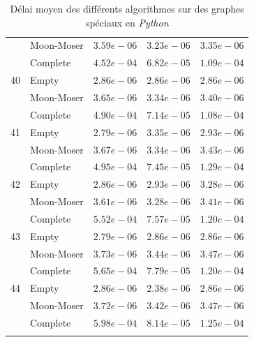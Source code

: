 \documentclass[12pt,a4paper]{article}
\begin{document}
\begin{longtable}{|l||l|l|l|l|}
  & Moon-Moser & $3.59e-06$ & $3.23e-06$ & $3.35e-06$ \\
  & Complete & $4.52e-04$ & $6.82e-05$ & $1.09e-04$ \\
  \hline
  40 & Empty & $2.86e-06$ & $2.86e-06$ & $2.86e-06$ \\
  & Moon-Moser & $3.65e-06$ & $3.34e-06$ & $3.40e-06$ \\
  & Complete & $4.90e-04$ & $7.14e-05$ & $1.08e-04$ \\
  \hline
  41 & Empty & $2.79e-06$ & $3.35e-06$ & $2.93e-06$ \\
  & Moon-Moser & $3.67e-06$ & $3.34e-06$ & $3.43e-06$ \\
  & Complete & $4.95e-04$ & $7.45e-05$ & $1.29e-04$ \\
  \hline
  42 & Empty & $2.86e-06$ & $2.93e-06$ & $3.28e-06$ \\
  & Moon-Moser & $3.61e-06$ & $3.28e-06$ & $3.41e-06$ \\
  & Complete & $5.52e-04$ & $7.57e-05$ & $1.20e-04$ \\
  \hline
  43 & Empty & $2.79e-06$ & $2.86e-06$ & $2.86e-06$ \\
  & Moon-Moser & $3.73e-06$ & $3.44e-06$ & $3.47e-06$ \\
  & Complete & $5.65e-04$ & $7.79e-05$ & $1.20e-04$ \\
  \hline
  44 & Empty & $2.86e-06$ & $2.38e-06$ & $2.86e-06$ \\
  & Moon-Moser & $3.72e-06$ & $3.42e-06$ & $3.47e-06$ \\
  & Complete & $5.98e-04$ & $8.14e-05$ & $1.25e-04$ \\
  \hline
  \caption{Délai moyen des différents algorithmes sur des graphes spéciaux en \emph{Python}}
\end{longtable}
\end{document}
